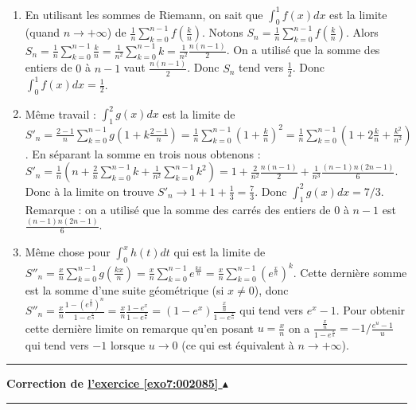 \documentclass[11pt,a4paper]{article}
\newcounter{exo}
\newcommand{\correction}[1]{\hypertarget{cor7:#1}{}\label{cor7:#1}{\bf Correction de \hyperlink{exo7:#1}{l'exercice \ref{exo7:#1} $\blacktriangle$}}\vspace{1mm}\hrule\vspace{1mm}}
\newcommand{\fincorrection}{\vspace{1mm}\hrule\vspace*{7mm}}
\begin{document}
  \begin{enumerate}
  \item En utilisant les sommes de Riemann, on sait que $\int_0^1f(x)d x$
est la limite (quand $n \to +\infty$) de $\frac 1n\sum_{k=0}^{n-1}  f(\frac kn)$.
Notons $S_n = \frac 1n \sum_{k=0}^{n-1}  f(\frac kn)$.
Alors $S_n = \frac 1n\sum_{k=0}^{n-1}\frac k{n}=\frac 1{n^2} \sum_{k=0}^{n-1} k = \frac 1{n^2} \frac{n(n-1)}{2}$. On a utilisé que la somme des entiers de $0$ à $n-1$ vaut $\frac{n(n-1)}{2}$. Donc $S_n$ tend vers $\frac 12$. Donc $\int_0^1f(x)d x = \frac 12$.
  \item Même travail : $\int_1^2 g(x)
d x$ est la limite de $S'_n = \frac {2-1} n\sum_{k=0}^{n-1}  g(1+ k\frac {2-1}n) = \frac 1 n \sum_{k=0}^{n-1}  (1+ \frac kn)^2 =  \frac 1 n \sum_{k=0}^{n-1}  (1+ 2\frac k n + \frac {k^2}{n^2})$.
En séparant la somme en trois nous obtenons : $S'_n = \frac 1n (n+\frac 2 n\sum_{k=0}^{n-1} k + \frac 1 {n^2} \sum_{k=0}^{n-1} k^2)= 1+\frac 2 {n^2} \frac{n(n-1)}{2}+ \frac 1 {n^3} \frac{(n-1)n(2n-1)}{6}$. Donc à la limite on trouve
$S'_n \to 1+1 + \frac 13 = \frac 73$. Donc $\int_1^2 g(x)
d x = 7/3$. Remarque : on a utilisé que la somme des carrés des entiers de $0$ à $n-1$ est $\frac{(n-1)n(2n-1)}{6}$.

  \item Même chose pour $\int_0^x h(t) d t$ qui est la limite de 
$S''_n = \frac {x} n\sum_{k=0}^{n-1}  g(\frac {kx}n) = \frac {x} n\sum_{k=0}^{n-1}  e^{\frac {kx}n} = \frac {x} n\sum_{k=0}^{n-1}  (e^{\frac {x}n})^k$. Cette dernière somme est la somme d'une suite géométrique (si $x\neq 0$), donc 
$S''_n = \frac {x} n \frac{1-(e^\frac xn)^n}{1-e^\frac xn}=  \frac {x} n \frac{1-e^x}{1-e^\frac xn}=(1-e^x) \frac{\frac xn}{1-e^\frac xn}$ 
qui tend vers $e^x-1$. 
Pour obtenir cette dernière limite on remarque qu'en posant 
$u=\frac xn$ on a $\frac{\frac xn}{1-e^\frac xn}= -1/ \frac{e^u-1}{u}$ qui tend vers $-1$
lorsque $u\to 0$ (ce qui est équivalent à $n\to +\infty$).

  \end{enumerate}
\fincorrection
\correction{002085}
\end{document}
